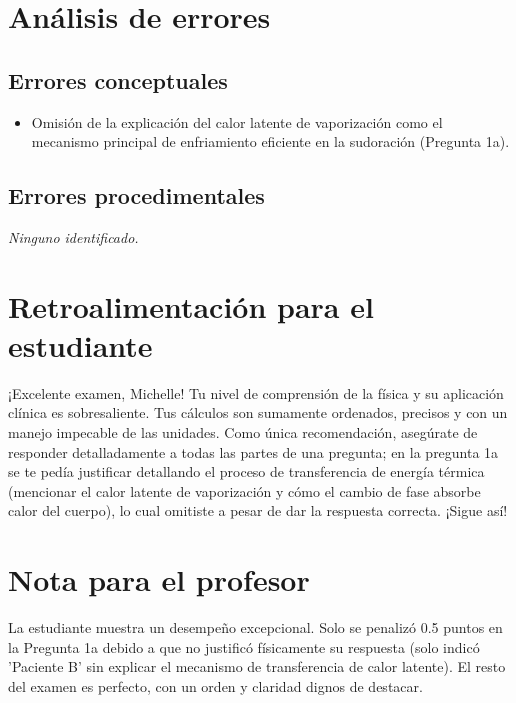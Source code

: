\documentclass[11pt,a4paper]{article}
\begin{document}
\section*{Análisis de errores}

\subsection*{Errores conceptuales}
\begin{itemize}[leftmargin=1.5em, itemsep=2pt]
  \item Omisión de la explicación del calor latente de vaporización como el mecanismo principal de enfriamiento eficiente en la sudoración (Pregunta 1a).
\end{itemize}

\subsection*{Errores procedimentales}
\textit{Ninguno identificado.}

\section*{Retroalimentación para el estudiante}
\begin{tcolorbox}[cajaRecomendacion, title={Dirigido a: Michelle Lopez}]
¡Excelente examen, Michelle! Tu nivel de comprensión de la física y su aplicación clínica es sobresaliente. Tus cálculos son sumamente ordenados, precisos y con un manejo impecable de las unidades. Como única recomendación, asegúrate de responder detalladamente a todas las partes de una pregunta; en la pregunta 1a se te pedía justificar detallando el proceso de transferencia de energía térmica (mencionar el calor latente de vaporización y cómo el cambio de fase absorbe calor del cuerpo), lo cual omitiste a pesar de dar la respuesta correcta. ¡Sigue así!
\end{tcolorbox}

\section*{Nota para el profesor}
\begin{tcolorbox}[
  enhanced, breakable,
  colback=yellow!8, colframe=yellow!60!black,
  fonttitle=\bfseries, coltitle=black,
  title={Observaciones para revisión manual},
  top=4pt, bottom=4pt, left=8pt, right=8pt,
]
La estudiante muestra un desempeño excepcional. Solo se penalizó 0.5 puntos en la Pregunta 1a debido a que no justificó físicamente su respuesta (solo indicó 'Paciente B' sin explicar el mecanismo de transferencia de calor latente). El resto del examen es perfecto, con un orden y claridad dignos de destacar.
\end{tcolorbox}
\end{document}
